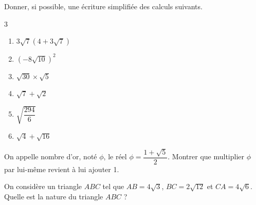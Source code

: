 {%
\begin{Exercice}
Donner, si possible, une écriture simplifiée des calculs suivants.
\begin{multicols}{3}
\begin{enumerate}[itemsep=1em]
	\item \begin{minipage}[t]{\linewidth} $ 3 \sqrt{7}\left( 4  +3\sqrt{7}\right)$ \end{minipage}
	\item \begin{minipage}[t]{\linewidth} $\left(-8 \sqrt{10}\right)^{2}$ \end{minipage}
	\item \begin{minipage}[t]{\linewidth} $ \sqrt{30}\times \sqrt{5}$ \end{minipage}
	\item \begin{minipage}[t]{\linewidth} $\sqrt{7}+\sqrt{2}$ \end{minipage}
	\item \begin{minipage}[t]{\linewidth} $ \sqrt{\dfrac{294}{6}}$ \end{minipage}
	\item \begin{minipage}[t]{\linewidth} $  \sqrt{4}+\sqrt{16}$ \end{minipage}
\end{enumerate}
\end{multicols}
\end{Exercice}

\begin{Exercice}
On appelle nombre d’or, noté $\phi$, le réel $\phi = \dfrac{1 + \sqrt{5}}{2}$. Montrer que multiplier $\phi$ par lui-même revient à lui ajouter 1.
\end{Exercice}

\begin{Exercice}
On considère un triangle $ABC$ tel que $AB = 4\sqrt{3}$, $BC = 2\sqrt{12}$ et $CA = 4\sqrt{6}$. Quelle est la nature du triangle $ABC$ ?
\end{Exercice}

}
